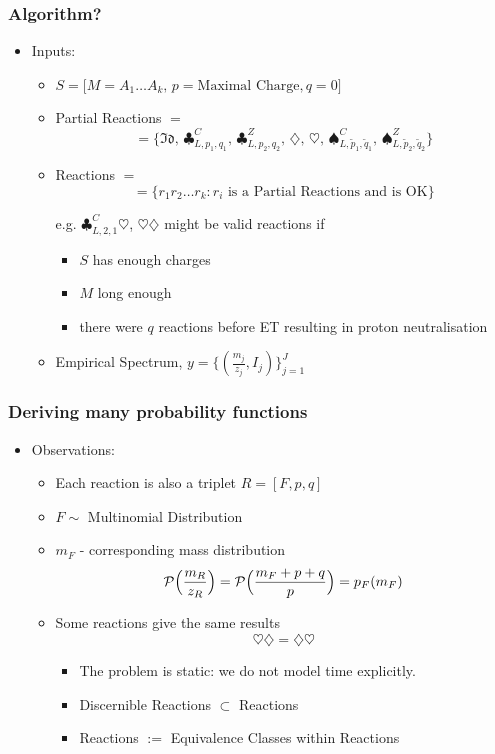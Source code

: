 \documentclass[xetex]{beamer}
\begin{document}
	\begin{frame}\frametitle{Algorithm?}

		\begin{itemize}
			\item Inputs:
			\begin{itemize}
				\item $S = \Big[M = A_1 \dots A_k,\, p = \text{Maximal Charge}, q = 0\Big]$
				\item Partial Reactions $ = $ 
					$$ = \{ 
					\mathfrak{Id},\,
					\clubsuit^C_{L , p_1, q_1},\,
					\clubsuit^Z_{L,p_2, q_2},\, 
					\diamondsuit,\, 
					\heartsuit,\, 
					\spadesuit^C_{L,\tilde{p}_1, \tilde{q}_1},\, 
					\spadesuit^Z_{L,\tilde{p}_2, \tilde{q}_2} \} $$
				\item Reactions $=$ 
					$$= \{ r_1 r_2 \dots r_k : r_i \text{ is a Partial Reactions and is OK} \} $$
				\item[e.g.] $\clubsuit^C_{L, 2,1} \heartsuit$, $\heartsuit \diamondsuit$ might be valid reactions if 
				\begin{itemize}
					\item $S$ has enough charges
					\item $M$ long enough
					\item there were $q$ reactions before ET resulting in proton neutralisation
				\end{itemize}
				\item Empirical Spectrum, $y = \Big\{ (\frac{m_j}{z_j}, I_j) \Big\}_{j = 1}^{J}$
			\end{itemize}
		\end{itemize}
	\end{frame}

	\begin{frame}\frametitle{Deriving many probability functions}
		\begin{itemize}
			\item Observations:
			\begin{itemize}
				\item Each reaction is also a triplet $R = [ F, p, q]$ 
				\item $F \sim$ Multinomial Distribution 
				\item $m_F$ - corresponding mass distribution
				$$ \mathcal{P}\Big(\frac{m_R}{z_R}\Big)  = \mathcal{P}\Big(\frac{m_F + p + q}{p}\Big) = p_F (m_F)$$
				\item Some reactions give the same results
				$$\heartsuit \diamondsuit = \diamondsuit \heartsuit$$
				\begin{itemize}
					\item The problem is static: we do not model time explicitly. 
					\item Discernible Reactions $\subset$ Reactions
					\item Reactions $:=$ Equivalence Classes within Reactions 
				\end{itemize}
			\end{itemize}
		\end{itemize}
	\end{frame}
\end{document}

